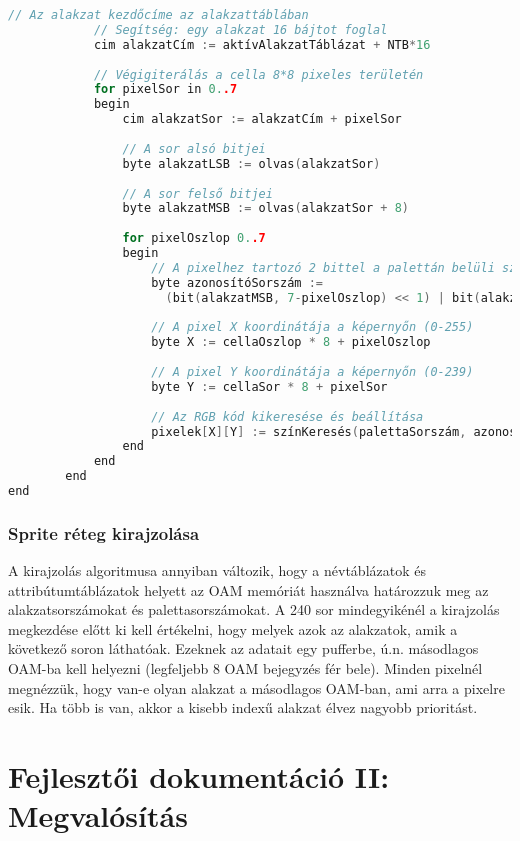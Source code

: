 \begin{lstlisting}[backgroundcolor = \color{white}, language=c, basicstyle=\scriptsize]
			// Az alakzat kezdőcíme az alakzattáblában
			// Segítség: egy alakzat 16 bájtot foglal
			cim alakzatCím := aktívAlakzatTáblázat + NTB*16
				
			// Végigiterálás a cella 8*8 pixeles területén
			for pixelSor in 0..7
			begin
				cim alakzatSor := alakzatCím + pixelSor
				
				// A sor alsó bitjei
				byte alakzatLSB := olvas(alakzatSor)
				
				// A sor felső bitjei		
				byte alakzatMSB := olvas(alakzatSor + 8)
				
				for pixelOszlop 0..7
				begin
					// A pixelhez tartozó 2 bittel a palettán belüli szín meghatározása
					byte azonosítóSorszám := 
					  (bit(alakzatMSB, 7-pixelOszlop) << 1) | bit(alakzatLSB, 7-pixelOszlop)
					
					// A pixel X koordinátája a képernyőn (0-255)
					byte X := cellaOszlop * 8 + pixelOszlop
					
					// A pixel Y koordinátája a képernyőn (0-239)
					byte Y := cellaSor * 8 + pixelSor
				
					// Az RGB kód kikeresése és beállítása
					pixelek[X][Y] := színKeresés(palettaSorszám, azonosítóSorszám)
				end
			end
		end
end


\end{lstlisting}

\subsection{Sprite réteg kirajzolása}

A kirajzolás algoritmusa annyiban változik, hogy a névtáblázatok és attribútumtáblázatok helyett az OAM memóriát használva határozzuk meg az alakzatsorszámokat és palettasorszámokat.
A 240 sor mindegyikénél a kirajzolás megkezdése előtt ki kell értékelni, hogy melyek azok az alakzatok, amik a következő soron láthatóak. Ezeknek az adatait egy pufferbe, ú.n. másodlagos OAM-ba kell helyezni (legfeljebb 8 OAM bejegyzés fér bele). Minden pixelnél megnézzük, hogy van-e olyan alakzat a másodlagos OAM-ban, ami arra a pixelre esik. Ha több is van, akkor a kisebb indexű alakzat élvez nagyobb prioritást. 

\clearpage

\chapter{Fejlesztői dokumentáció II: Megvalósítás} %

